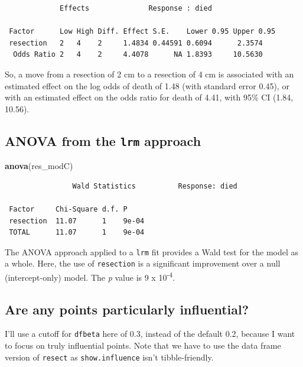 \documentclass[]{book}
\newenvironment{Shaded}{\begin{snugshade}}{\end{snugshade}}
\newcommand{\KeywordTok}[1]{\textcolor[rgb]{0.13,0.29,0.53}{\textbf{#1}}}
\newcommand{\NormalTok}[1]{#1}
\theoremstyle{definition}
\theoremstyle{definition}
\theoremstyle{definition}
\theoremstyle{remark}
\begin{document}
\begin{verbatim}
             Effects              Response : died 

 Factor      Low High Diff. Effect S.E.    Lower 0.95 Upper 0.95
 resection   2   4    2     1.4834 0.44591 0.6094      2.3574   
  Odds Ratio 2   4    2     4.4078      NA 1.8393     10.5630   
\end{verbatim}

So, a move from a resection of 2 cm to a resection of 4 cm is associated
with an estimated effect on the log odds of death of 1.48 (with standard
error 0.45), or with an estimated effect on the odds ratio for death of
4.41, with 95\% CI (1.84, 10.56).

\subsection{\texorpdfstring{ANOVA from the \texttt{lrm}
approach}{ANOVA from the lrm approach}}\label{anova-from-the-lrm-approach}

\begin{Shaded}
\begin{Highlighting}[]
\KeywordTok{anova}\NormalTok{(res_modC)}
\end{Highlighting}
\end{Shaded}

\begin{verbatim}
                Wald Statistics          Response: died 

 Factor     Chi-Square d.f. P    
 resection  11.07      1    9e-04
 TOTAL      11.07      1    9e-04
\end{verbatim}

The ANOVA approach applied to a \texttt{lrm} fit provides a Wald test
for the model as a whole. Here, the use of \texttt{resection} is a
significant improvement over a null (intercept-only) model. The \emph{p}
value is 9 x 10\textsuperscript{-4}.

\subsection{Are any points particularly
influential?}\label{are-any-points-particularly-influential}

I'll use a cutoff for \texttt{dfbeta} here of 0.3, instead of the
default 0.2, because I want to focus on truly influential points. Note
that we have to use the data frame version of \texttt{resect} as
\texttt{show.influence} isn't tibble-friendly.
\end{document}
